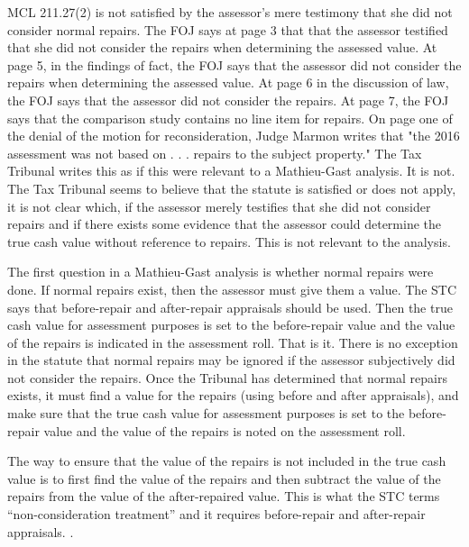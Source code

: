 MCL 211.27(2) is not satisfied by the assessor's mere testimony that she did not consider normal repairs.
The FOJ says at page 3 that that the assessor testified that she did not consider the repairs when determining the assessed value. At page 5, in the findings of fact, the FOJ says that the assessor did not consider the repairs when determining the assessed value. At page 6 in the discussion of law, the FOJ says that the assessor did not consider the repairs. At page 7, the FOJ says that the comparison study contains no line item for repairs. On page one of the denial of the motion for reconsideration, Judge Marmon writes that "the 2016 assessment was not based on . . . repairs to the subject property." The Tax Tribunal writes this as if this were relevant to a Mathieu-Gast analysis. It is not. The Tax Tribunal seems to believe that the statute is satisfied or does not apply, it is not clear which, if the assessor merely testifies that she did not consider repairs and if there exists some evidence that the assessor could determine the true cash value without reference to repairs. This is not relevant to the analysis.

The first question in a Mathieu-Gast analysis is whether normal repairs were done. If normal repairs exist, then the assessor must give them a value. The STC says that before-repair and after-repair appraisals should be used. Then the true cash value for assessment purposes is set to the before-repair value and the value of the repairs is indicated in the assessment roll. That is it. There is no exception in the statute that normal repairs may be ignored if the assessor subjectively did not consider the repairs. Once the Tribunal has determined that normal repairs exists, it must find a value for the repairs (using before and after appraisals), and make sure that the true cash value for assessment purposes is set to the before-repair value and the value of the repairs is noted on the assessment roll. 


The way to ensure that the value of the repairs is not included in the true cash value is to first find the value of the repairs and then subtract the value of the repairs from the value of the after-repaired value. This is what the STC terms ``non-consideration treatment'' and it requires before-repair and after-repair appraisals. . 
